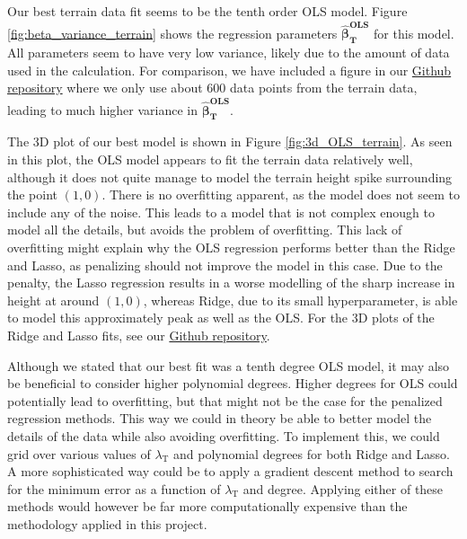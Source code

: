 \documentclass[a4paper, 10pt]{article}
\begin{document}
\begin{multicols}{2}
Our best terrain data fit seems to be the tenth order OLS model. Figure \ref{fig:beta_variance_terrain} shows the regression parameters $\bm{\hat{\beta}_\text{T}^\text{OLS}}$ for this model. All parameters seem to have very low variance, likely due to the amount of data used in the calculation. For comparison, we have included a figure in our \href{https://github.com/bernharl/FYS-STK4155-project1}{Github repository} where we only use about 600 data points from the terrain data, leading to much higher variance in $\bm{\hat{\beta}_\text{T}^\text{OLS}}$. 

The 3D plot of our best model is shown in Figure \ref{fig:3d_OLS_terrain}. As seen in this plot, the OLS model appears to fit the terrain data relatively well,  although it does not quite manage to model the terrain height spike surrounding the point $(1, 0)$.  There is no overfitting apparent, as the model does not seem to include any of the noise. This leads to a model that is not complex enough to model all the details, but avoids the problem of overfitting. This lack of overfitting might explain why the OLS regression performs better than the Ridge and Lasso, as penalizing should not improve the model in this case. Due to the penalty, the Lasso regression results in a worse modelling of the sharp increase in height at around $(1, 0)$, whereas Ridge, due to its small hyperparameter, is able to model this approximately peak as well as the OLS.   For the 3D plots of the Ridge and Lasso fits, see our \href{https://github.com/bernharl/FYS-STK4155-project1}{Github repository}.

Although we stated that our best fit was a tenth degree OLS model, it may also be beneficial to consider higher polynomial degrees. Higher degrees for OLS could potentially lead to overfitting, but that might not be the case for the penalized regression methods. This way we could in theory be able to better model the details of the data while also avoiding overfitting. To implement this, we could grid over various values of $\lambda_\text{T}$ and polynomial degrees for both Ridge and Lasso. A more sophisticated way could be to apply a gradient descent method to search for the minimum error as a function of $\lambda_\text{T}$ and degree. Applying either of these methods would however be far more computationally expensive than the methodology applied in this project. 


\end{multicols}
\end{document}
